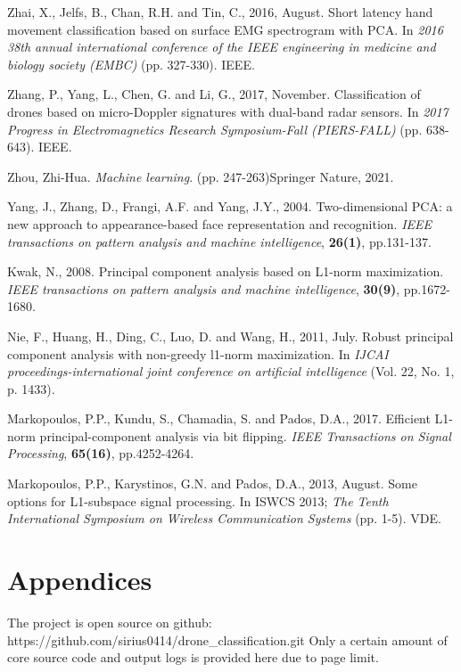 \documentclass{cta-author}
\begin{document}
\begin{thebibliography}{9}
Zhai, X., Jelfs, B., Chan, R.H. and Tin, C., 2016, August. Short latency hand movement classification based on surface EMG spectrogram with PCA. In \textit{2016 38th annual international conference of the IEEE engineering in medicine and biology society (EMBC)} (pp. 327-330). IEEE.

Zhang, P., Yang, L., Chen, G. and Li, G., 2017, November. Classification of drones based on micro-Doppler signatures with dual-band radar sensors. In \textit{2017 Progress in Electromagnetics Research Symposium-Fall (PIERS-FALL)} (pp. 638-643). IEEE.

Zhou, Zhi-Hua. \textit{Machine learning}. (pp. 247-263)Springer Nature, 2021.

Yang, J., Zhang, D., Frangi, A.F. and Yang, J.Y., 2004. Two-dimensional PCA: a new approach to appearance-based face representation and recognition. \textit{IEEE transactions on pattern analysis and machine intelligence}, \textbf{26(1)}, pp.131-137.

Kwak, N., 2008. Principal component analysis based on L1-norm maximization. \textit{IEEE transactions on pattern analysis and machine intelligence}, \textbf{30(9)}, pp.1672-1680.

Nie, F., Huang, H., Ding, C., Luo, D. and Wang, H., 2011, July. Robust principal component analysis with non-greedy l1-norm maximization. In \textit{IJCAI proceedings-international joint conference on artificial intelligence} (Vol. 22, No. 1, p. 1433).

Markopoulos, P.P., Kundu, S., Chamadia, S. and Pados, D.A., 2017. Efficient L1-norm principal-component analysis via bit flipping. \textit{IEEE Transactions on Signal Processing}, \textbf{65(16)}, pp.4252-4264.

Markopoulos, P.P., Karystinos, G.N. and Pados, D.A., 2013, August. Some options for L1-subspace signal processing. In ISWCS 2013; \textit{The Tenth International Symposium on Wireless Communication Systems} (pp. 1-5). VDE.
\end{thebibliography}
\vfill\pagebreak
\section{Appendices}\label{sec14}
The project is open source on github: \newline
https://github.com/sirius0414/drone\_classification.git\newline
Only a certain amount of core source code and output logs is provided here due to page limit.
\end{document}
